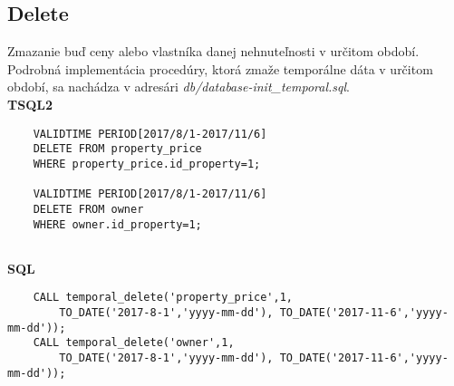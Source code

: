 \documentclass[11pt, a4paper]{article}
\begin{document}
\subsection{Delete}
Zmazanie buď ceny alebo vlastníka danej nehnuteľnosti v určitom období. Podrobná implementácia procedúry, ktorá zmaže temporálne dáta v určitom období, sa nachádza v adresári \textit{db/database-init\_temporal.sql}.\\

\textbf{TSQL2}

\begin{center}
\begin{verbatim}
    VALIDTIME PERIOD[2017/8/1-2017/11/6]
    DELETE FROM property_price 
    WHERE property_price.id_property=1;
    
    VALIDTIME PERIOD[2017/8/1-2017/11/6]
    DELETE FROM owner 
    WHERE owner.id_property=1;
    
\end{verbatim}
\end{center}

\textbf{SQL}
\begin{center}
\begin{verbatim}
    CALL temporal_delete('property_price',1,
        TO_DATE('2017-8-1','yyyy-mm-dd'), TO_DATE('2017-11-6','yyyy-mm-dd'));
    CALL temporal_delete('owner',1,
        TO_DATE('2017-8-1','yyyy-mm-dd'), TO_DATE('2017-11-6','yyyy-mm-dd'));
\end{verbatim}
\end{center}
\end{document}
